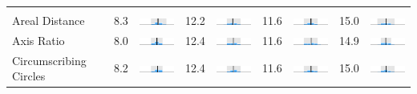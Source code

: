 \begin{table}
\begin{tabular}{l rm{7em} rm{7em} rm{7em} rm{7em}}
\\ \hline \\ 
Areal Distance         &   8.3 &       \includegraphics[width=7em]{mini_hist/TX_2004_dist_a} &  12.2 &       \includegraphics[width=7em]{mini_hist/TX_2008_dist_a} &  11.6 &       \includegraphics[width=7em]{mini_hist/TX_2012_dist_a} &  15.0 &       \includegraphics[width=7em]{mini_hist/TX_2016_dist_a} \\
Axis Ratio             &   8.0 &   \includegraphics[width=7em]{mini_hist/TX_2004_axis_ratio} &  12.4 &   \includegraphics[width=7em]{mini_hist/TX_2008_axis_ratio} &  11.6 &   \includegraphics[width=7em]{mini_hist/TX_2012_axis_ratio} &  14.9 &   \includegraphics[width=7em]{mini_hist/TX_2016_axis_ratio} \\
Circumscribing Circles &   8.2 &        \includegraphics[width=7em]{mini_hist/TX_2004_reock} &  12.4 &        \includegraphics[width=7em]{mini_hist/TX_2008_reock} &  11.6 &        \includegraphics[width=7em]{mini_hist/TX_2012_reock} &  15.0 &        \includegraphics[width=7em]{mini_hist/TX_2016_reock} \\

\end{tabular}
\end{table}
